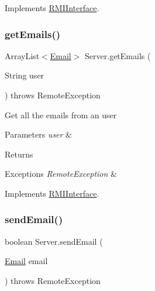Implements \hyperlink{interface_r_m_i_interface_a86bc2a5cb0bdb04a1aeb9b36e373cd5e}{R\+M\+I\+Interface}.

\mbox{\label{class_server_a348f49650335ef5341a4d960d6adac2e}} 
\subsubsection{\texorpdfstring{get\+Emails()}{getEmails()}}
{\footnotesize\ttfamily Array\+List$<$\hyperlink{class_email}{Email}$>$ Server.\+get\+Emails (\begin{DoxyParamCaption}\item[{String}]{user }\end{DoxyParamCaption}) throws Remote\+Exception}

Get all the emails from an user 
\begin{DoxyParams}{Parameters}
{\em user} & \\
\hline
\end{DoxyParams}
\begin{DoxyReturn}{Returns}

\begin{DoxyItemize}
\item 
\end{DoxyItemize}
\end{DoxyReturn}

\begin{DoxyExceptions}{Exceptions}
{\em Remote\+Exception} & \\
\hline
\end{DoxyExceptions}


Implements \hyperlink{interface_r_m_i_interface_ad326010c8c132dd3398a4443cf827601}{R\+M\+I\+Interface}.

\mbox{\label{class_server_a4c26769f2867086519a196bc92502af6}} 
\subsubsection{\texorpdfstring{send\+Email()}{sendEmail()}}
{\footnotesize\ttfamily boolean Server.\+send\+Email (\begin{DoxyParamCaption}\item[{\hyperlink{class_email}{Email}}]{email }\end{DoxyParamCaption}) throws Remote\+Exception}

